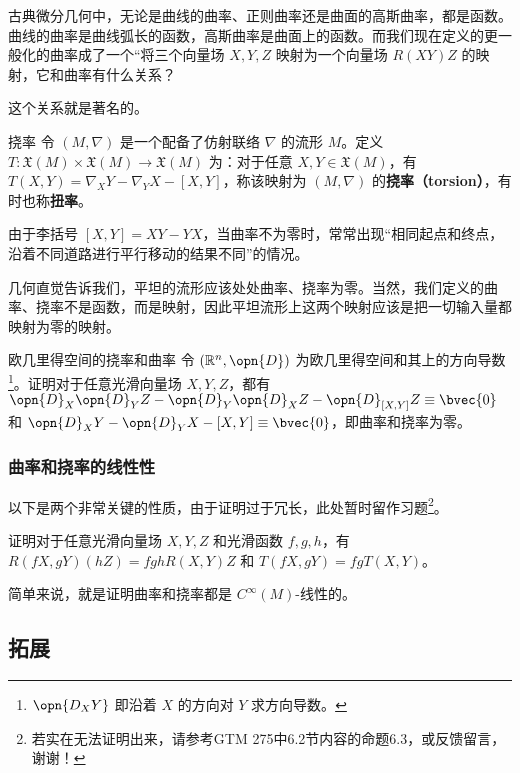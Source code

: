 古典微分几何中，无论是曲线的曲率、正则曲率还是曲面的高斯曲率，都是函数。曲线的曲率是曲线弧长的函数，高斯曲率是曲面上的函数。而我们现在定义的更一般化的曲率成了一个“将三个向量场 $X, Y, Z$ 映射为一个向量场 $R(XY)Z$ 的映射，它和曲率有什么关系？

这个关系就是著名的。


\begin{definition}{挠率}
令 $(M, \nabla)$ 是一个配备了仿射联络 $\nabla$ 的流形 $M$。定义 $T:\mathfrak{X}(M)\times\mathfrak{X}(M)\to\mathfrak{X}(M)$ 为：对于任意 $X, Y\in\mathfrak{X}(M)$，有 $T(X, Y)=\nabla_XY-\nabla_YX-{[X, Y]}$，称该映射为 $(M, \nabla)$ 的\textbf{挠率（torsion）}，有时也称\textbf{扭率}。
\end{definition}

由于李括号 $[X, Y]=XY-YX$，当曲率不为零时，常常出现“相同起点和终点，沿着不同道路进行平行移动的结果不同”的情况。

几何直觉告诉我们，平坦的流形应该处处曲率、挠率为零。当然，我们定义的曲率、挠率不是函数，而是映射，因此平坦流形上这两个映射应该是把一切输入量都映射为零的映射。

\begin{exercise}{欧几里得空间的挠率和曲率}
令 $(\mathbb{R}^n, \opn{D})$ 为欧几里得空间和其上的方向导数\footnote{$\opn{D_XY}$ 即沿着 $X$ 的方向对 $Y$ 求方向导数。}。证明对于任意光滑向量场 $X, Y, Z$，都有 $\opn{D}_X\opn{D}_YZ-\opn{D}_Y\opn{D}_XZ-\opn{D}_{[X, Y]}Z\equiv\bvec{0}$ 和 $\opn{D}_XY-\opn{D}_YX-{[X, Y]}\equiv\bvec{0}$，即曲率和挠率为零。
\end{exercise}

\subsubsection{曲率和挠率的线性性}

以下是两个非常关键的性质，由于证明过于冗长，此处暂时留作习题\footnote{若实在无法证明出来，请参考GTM 275\cite{GTM275}中6.2节内容的命题6.3，或反馈留言，谢谢！}。

\begin{exercise}{}\label{exe_affcon_1}
证明对于任意光滑向量场 $X, Y, Z$ 和光滑函数 $f, g, h$，有 $R(fX, gY)(hZ)=fghR(X, Y)Z$ 和 $T(fX, gY)=fgT(X, Y)$。

简单来说，就是证明曲率和挠率都是 $C^{\infty}(M)$-线性的。
\end{exercise}





\subsection{拓展}

